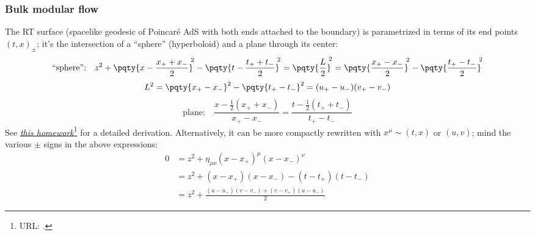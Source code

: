 \documentclass[a4paper
	,10pt
]{article}
\begin{document}
\subsubsection{Bulk modular flow}
	The RT surface (spacelike geodesic of Poincar\'e AdS with both ends attached to the boundary) is parametrized in terms of its end points $(t,x)_\pm$; it's the intersection of a ``sphere'' (hyperboloid) and a plane through its center:
	\begin{equation}
	\text{``sphere'':}\quad
		z^2
		+ \pqty{x - \frac{x_+ + x_-}{2}}^{\!\!2}
		- \pqty{t - \frac{t_+ + t_-}{2}}^{\!\!2}
		= \pqty{\frac{L}{2}}^{\!\!2}
		= \pqty{\frac{x_+ - x_-}{2}}^{\!\!2}
		- \pqty{\frac{t_+ - t_-}{2}}^{\!\!2}
	\end{equation}
	\begin{equation}
		L^2
		= \pqty{x_+ - x_-}^2
			- \pqty{t_+ - t_-}^2
		= (u_+ - u_-)(v_+ - v_-)
	\end{equation}
	\begin{equation}
	\text{plane:}\quad
		\frac{x - \frac{1}{2} (x_+ + x_-)}{x_+ - x_-}
		= \frac{t - \frac{1}{2} (t_+ + t_-)}{t_+ - t_-}
	\end{equation}
	See \href{https://bryango.github.io/resources/archive/HW-Gravity/gravity1.pdf}{\textsl{this homework}}\footnote{
		URL: . 
	} for a detailed derivation. 
	Alternatively, it can be more compactly rewritten with $x^\mu \sim (t,x)$ or $(u,v)$; mind the various $\pm$ signs in the above expressions: 
	\begin{equation}
	\begin{aligned}
		0 &= z^2
			+ \eta_{\mu\nu} (x - x_+)^\mu (x - x_-)^\nu \\
		& = z^2
			+ (x - x_+)(x - x_-)
			- (t - t_+)(t - t_-) \\
		&= z^2 + \frac{
				(u - u_+)(v - v_-)
				+ (v - v_+)(u - u_-)
			}{2}
	\end{aligned}
	\end{equation}
	
\end{document}
